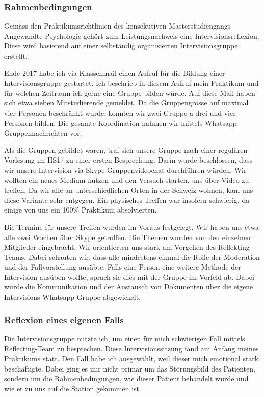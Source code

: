 \subsubsection{Rahmenbedingungen}
Gemäss den Praktikumsrichtlinien des konsekutiven Masterstudiengangs Angewandte Psychologie gehört zum Leistungsnachweis eine Intervisionsreflexion. Diese wird basierend auf einer selbständig organisierten Intervisionsgruppe erstellt. 

Ende 2017 habe ich via Klassenmail einen Aufruf für die Bildung einer Intervisionsgruppe gestartet. Ich beschrieb in diesem Aufruf mein Praktikum und für welchen Zeitraum ich gerne eine Gruppe bilden würde. Auf diese Mail haben sich etwa sieben Mitstudierende gemeldet. Da die Gruppengrösse auf maximal vier Personen beschränkt wurde, konnten wir zwei Gruppe a drei und vier Personen bilden. Die gesamte Koordination nahmen wir mittels Whatsapp-Gruppennachrichten vor.

Als die Gruppen gebildet waren, traf sich unsere Gruppe nach einer regulären Vorlesung im HS17 zu einer ersten Besprechung. Darin wurde beschlossen, dass wir unsere Intervision via Skype-Gruppenvideochat durchführen würden. Wir wollten ein neues Medium nutzen und den Versuch starten, uns über Video zu treffen. Da wir alle an unterschiedlichen Orten in der Schweiz wohnen, kam uns diese Variante sehr entgegen. Ein physisches Treffen war insofern schwierig, da einige von uns ein 100\% Praktikum absolvierten.

Die Termine für unsere Treffen wurden im Voraus festgelegt. Wir haben uns etwa alle zwei Wochen über Skype getroffen. Die Themen wurden von den einzelnen Mitglieder eingebracht. Wir orientierten uns stark am Vorgehen des Reflekting-Teams. Dabei schauten wir, dass alle mindestens einmal die Rolle der Moderation und der Fallvorstellung ausübte. Falls eine Person eine weitere Methode der Intervision ausüben wollte, sprach sie dies mit der Gruppe im Vorfeld ab. Dabei wurde die Kommunikation und der Austausch von Dokumenten über die eigene Intervisions-Whatsapp-Gruppe abgewickelt.

\subsubsection{Reflexion eines eigenen Falls}
Die Intervisionsgruppe nutzte ich, um einen für mich  schwierigen Fall mittels Reflecting-Team zu besprechen. Diese Intervisionssitzung fand am Anfang meines Praktikums statt. Den Fall habe ich ausgewählt, weil dieser mich emotional stark beschäftigte. Dabei ging es mir nicht primär um das Störungsbild des Patienten, sondern um die Rahmenbedingungen, wie dieser Patient behandelt wurde und wie er zu uns auf die Station gekommen ist. 

